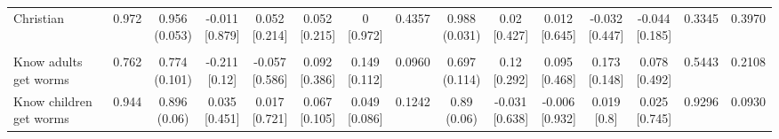 \documentclass[
]{article}
\begin{document}
\begin{table}
{\begin{tabular}[t]{lcccccccccccccc}
\hspace{1em}Christian & 0.972 & \makecell[c]{0.956\\(0.053)} & \makecell[c]{-0.011\\{[0.879]}} & \makecell[c]{0.052\\{[0.214]}} & \makecell[c]{0.052\\{[0.215]}} & \makecell[c]{0\\{[0.972]}} & 0.4357 & \makecell[c]{0.988\\(0.031)} & \makecell[c]{0.02\\{[0.427]}} & \makecell[c]{0.012\\{[0.645]}} & \makecell[c]{-0.032\\{[0.447]}} & \makecell[c]{-0.044\\{[0.185]}} & 0.3345 & 0.3970\\
\addlinespace[0.3em]
\hline
\multicolumn{15}{l}{\textit{\textbf{Panel C: Deworming knowledge, $N=252$}}}\\
\hline
\hspace{1em}Know adults get worms & 0.762 & \makecell[c]{0.774\\(0.101)} & \makecell[c]{-0.211\\{[0.12]}} & \makecell[c]{-0.057\\{[0.586]}} & \makecell[c]{0.092\\{[0.386]}} & \makecell[c]{0.149\\{[0.112]}} & 0.0960 & \makecell[c]{0.697\\(0.114)} & \makecell[c]{0.12\\{[0.292]}} & \makecell[c]{0.095\\{[0.468]}} & \makecell[c]{0.173\\{[0.148]}} & \makecell[c]{0.078\\{[0.492]}} & 0.5443 & 0.2108\\
\hspace{1em}Know children get worms & 0.944 & \makecell[c]{0.896\\(0.06)} & \makecell[c]{0.035\\{[0.451]}} & \makecell[c]{0.017\\{[0.721]}} & \makecell[c]{0.067\\{[0.105]}} & \makecell[c]{0.049\\{[0.086]}} & 0.1242 & \makecell[c]{0.89\\(0.06)} & \makecell[c]{-0.031\\{[0.638]}} & \makecell[c]{-0.006\\{[0.932]}} & \makecell[c]{0.019\\{[0.8]}} & \makecell[c]{0.025\\{[0.745]}} & 0.9296 & 0.0930\\

\end{tabular}}
\end{table}
\end{document}
